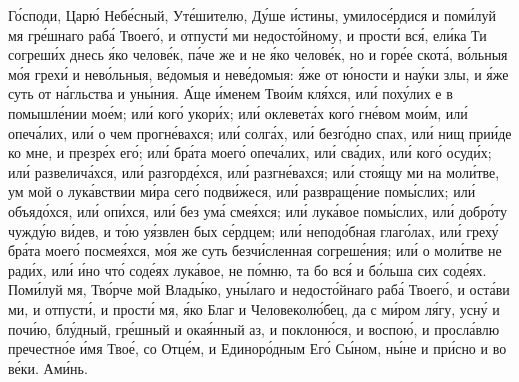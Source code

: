 \begin{mymulticols}
Г\'{о}споди, Цар\'{ю} Неб\'{е}сный, Ут\'{е}шителю, Д\'{у}ше \'{и}стины, умилос\'{е}рдися и пом\'{и}луй мя гр\'{е}шнаго раб\'{а} Твоег\'{о}, и отпуст\'{и} ми недост\'{о}йному, и прост\'{и} вс\'{я}, ел\'{и}ка Ти согреш\'{и}х днесь \'{я}ко челов\'{е}к, п\'{а}че же и не \'{я}ко челов\'{е}к, но и гор\'{е}е скот\'{а}, в\'{о}льныя м\'{о}я грех\'{и} и нев\'{о}льныя, в\'{е}домыя и нев\'{е}домыя: \'{я}же от \'{ю}ности и на\'{у}ки злы, и \'{я}же суть от н\'{а}гльства и ун\'{ы}ния. \'{А}ще \'{и}менем Тво\'{и}м кл\'{я}хся, ил\'{и} пох\'{у}лих е в помышл\'{е}нии мо\'{е}м; ил\'{и} ког\'{о} укор\'{и}х; ил\'{и} оклевет\'{а}х ког\'{о} гн\'{е}вом мо\'{и}м, ил\'{и} опеч\'{а}лих, ил\'{и} о чем прогн\'{е}вахся; ил\'{и} солг\'{а}х, ил\'{и} безг\'{о}дно спах, ил\'{и} нищ при\'{и}де ко мне, и презр\'{е}х ег\'{о}; ил\'{и} бр\'{а}та моег\'{о} опеч\'{а}лих, ил\'{и} св\'{а}дих, ил\'{и} ког\'{о} осуд\'{и}х; ил\'{и} развелич\'{а}хся, ил\'{и} разгорд\'{е}хся, ил\'{и} разгн\'{е}вахся; ил\'{и} сто\'{я}щу ми на мол\'{и}тве, ум мой о лук\'{а}вствии м\'{и}ра сег\'{о} подв\'{и}жеся, ил\'{и} развращ\'{е}ние пом\'{ы}слих; ил\'{и} объяд\'{о}хся, ил\'{и} оп\'{и}хся, ил\'{и} без ум\'{а} сме\'{я}хся; ил\'{и} лук\'{а}вое пом\'{ы}слих, ил\'{и} добр\'{о}ту чужд\'{у}ю в\'{и}дев, и т\'{о}ю у\'{я}звлен бых с\'{е}рдцем; ил\'{и} непод\'{о}бная глаг\'{о}лах, ил\'{и} грех\'{у} бр\'{а}та моег\'{о} посме\'{я}хся, м\'{о}я же суть безч\'{и}сленная согреш\'{е}ния; ил\'{и} о мол\'{и}тве не рад\'{и}х, ил\'{и} \'{и}но чт\'{о} сод\'{е}ях лук\'{а}вое, не п\'{о}мню, та бо вс\'{я} и б\'{о}льша сих сод\'{е}ях. Пом\'{и}луй мя, Тв\'{о}рче мой Влад\'{ы}ко, ун\'{ы}лаго и недост\'{о}йнаго раб\'{а} Твоег\'{о}, и ост\'{а}ви ми, и отпуст\'{и}, и прост\'{и} мя, \'{я}ко Благ и Человекол\'{ю}бец, да с м\'{и}ром л\'{я}гу, усн\'{у} и поч\'{и}ю, бл\'{у}дный, гр\'{е}шный и ока\'{я}нный аз, и поклон\'{ю}ся, и воспо\'{ю}, и просл\'{а}влю пречестн\'{о}е \'{и}мя Тво\'{е}, со Отц\'{е}м, и Единор\'{о}дным Ег\'{о} С\'{ы}ном, н\'{ы}не и пр\'{и}сно и во в\'{е}ки. Ам\'{и}нь.



\end{mymulticols}
